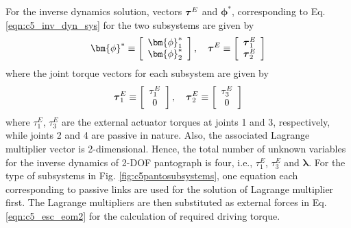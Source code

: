 {For the inverse dynamics solution, vectors $\mbox{\boldmath$\tau$}^E$ and $\bm{\phi}^*$, corresponding to Eq. \ref{eqn:c5_inv_dyn_sys} for the two subsystems are given by
\begin{equation}
\bm{\phi}^* \equiv 
\left[ \begin{array}{c}
\bm{\phi}_1^*\\
\bm{\phi}_2^*\\
\end{array} \right], \hspace{10pt}
\mbox{\boldmath$\tau$}^E \equiv 
\left[ \begin{array}{c}
\mbox{\boldmath$\tau$}_1^E\\
\mbox{\boldmath$\tau$}_2^E\\
\end{array} \right]
\end{equation}
where the joint torque vectors for each subsystem are given by
\begin{equation}
\mbox{\boldmath$\tau$}_1^E \equiv 
\left[ \begin{array}{c}
\tau_1^E\\
0\\
\end{array} \right], \hspace{10pt}
\mbox{\boldmath$\tau$}_2^E \equiv 
\left[ \begin{array}{c}
\tau_3^E\\
0\\
\end{array} \right]
\end{equation}
where $\tau_1^E$, $\tau_3^E$ are the external actuator torques at joints 1 and 3, respectively, while joints 2 and 4 are passive in nature. Also, the associated Lagrange multiplier vector is 2-dimensional. Hence, the total number of unknown variables for the inverse dynamics of 2-DOF pantograph is four, i.e., $\tau_1^E$, $\tau_3^E$ and $\bm{\lambda}$. For the type of subsystems in Fig. \ref{fig:c5pantosubsystems}, one equation each corresponding to passive links are used for the solution of Lagrange multiplier first. The Lagrange multipliers are then substituted as external forces in Eq. \ref{eqn:c5_esc_eom2} for the calculation of required driving torque. 

}
